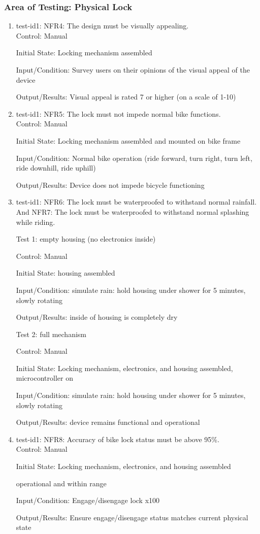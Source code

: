 \documentclass[12pt, titlepage]{article}
\begin{document}
\subsubsection{Area of Testing: Physical Lock}
\begin{enumerate}
\item{test-id1: NFR4: The design must be visually appealing. \\}
Control: Manual 

Initial State: Locking mechanism assembled 

Input/Condition: Survey users on their opinions of the visual appeal of the device 

Output/Results: Visual appeal is rated 7 or higher (on a scale of 1-10) 

\item{test-id1: NFR5: The lock must not impede normal bike functions. \\}
Control: Manual 

Initial State: Locking mechanism assembled and mounted on bike frame 

Input/Condition: Normal bike operation (ride forward, turn right, turn left, ride downhill, ride uphill) 

Output/Results: Device does not impede bicycle functioning 

\item{test-id1: NFR6: The lock must be waterproofed to withstand normal rainfall. And NFR7:  The lock must be waterproofed to withstand normal splashing while riding. \\}

Test 1: empty housing (no electronics inside) 

Control: Manual 

Initial State: housing assembled 

Input/Condition: simulate rain: hold housing under shower for 5 minutes, slowly rotating 

Output/Results: inside of housing is completely dry 

Test 2: full mechanism 

Control: Manual 

Initial State: Locking mechanism, electronics, and housing assembled, microcontroller on 

Input/Condition: simulate rain: hold housing under shower for 5 minutes, slowly rotating 

Output/Results: device remains functional and operational 

\item{test-id1: NFR8: Accuracy of bike lock status must be above 95\%. \\}
Control: Manual 

Initial State: Locking mechanism, electronics, and housing assembled 

 operational and within range  

Input/Condition: Engage/disengage lock x100 

Output/Results: Ensure engage/disengage status matches current physical state 
\end{enumerate}
\end{document}
